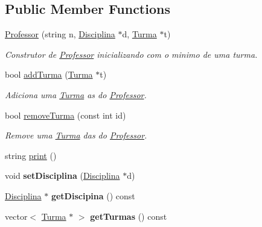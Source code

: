 \subsection*{Public Member Functions}
\begin{DoxyCompactItemize}
\item 
\hyperlink{class_professor_a8e20e8472f95da9e7dbbe043b2ca40c0}{Professor} (string n, \hyperlink{class_disciplina}{Disciplina} $\ast$d, \hyperlink{class_turma}{Turma} $\ast$t)
\begin{DoxyCompactList}\small\item\em Construtor de \hyperlink{class_professor}{Professor} inicializando com o minimo de uma turma. \end{DoxyCompactList}\item 
bool \hyperlink{class_professor_a4242c678534b7effaec214ad2f8a3079}{add\-Turma} (\hyperlink{class_turma}{Turma} $\ast$t)
\begin{DoxyCompactList}\small\item\em Adiciona uma \hyperlink{class_turma}{Turma} as do \hyperlink{class_professor}{Professor}. \end{DoxyCompactList}\item 
bool \hyperlink{class_professor_a1cc34746e255348252f50e0b6ab34e41}{remove\-Turma} (const int id)
\begin{DoxyCompactList}\small\item\em Remove uma \hyperlink{class_turma}{Turma} das do \hyperlink{class_professor}{Professor}. \end{DoxyCompactList}\item 
string \hyperlink{class_professor_a3fcf6e5e91713f69e178d3c77524f9bc}{print} ()
\item 
\hypertarget{class_professor_a6670967a09f78b6d0016a2e3417c238f}{void {\bfseries set\-Disciplina} (\hyperlink{class_disciplina}{Disciplina} $\ast$d)}\label{class_professor_a6670967a09f78b6d0016a2e3417c238f}

\item 
\hypertarget{class_professor_ae09b97fead0e86fa47e9d477a1f4b1d5}{\hyperlink{class_disciplina}{Disciplina} $\ast$ {\bfseries get\-Discipina} () const }\label{class_professor_ae09b97fead0e86fa47e9d477a1f4b1d5}

\item 
\hypertarget{class_professor_a9474309b22807309eacd155312b9f65d}{vector$<$ \hyperlink{class_turma}{Turma} $\ast$ $>$ {\bfseries get\-Turmas} () const }\label{class_professor_a9474309b22807309eacd155312b9f65d}


\end{DoxyCompactItemize}
